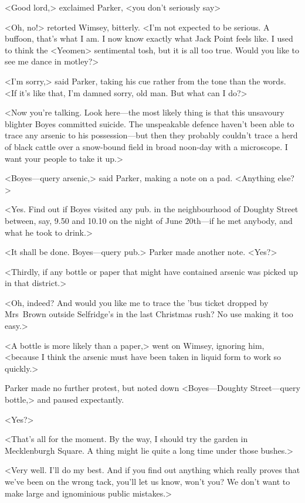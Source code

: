 <Good lord,> exclaimed Parker, <you don't seriously say\longdash>

<Oh, no!> retorted Wimsey, bitterly. <I'm not expected to be serious. A buffoon, that's what I am. I now know exactly what Jack Point feels like. I used to think the <Yeomen> sentimental tosh, but it is all too true. Would you like to see me dance in motley?>

<I'm sorry,> said Parker, taking his cue rather from the tone than the words. <If it's like that, I'm damned sorry, old man. But what can I do?>

<Now you're talking. Look here—the most likely thing is that this unsavoury blighter Boyes committed suicide. The unspeakable defence haven't been able to trace any arsenic to his possession—but then they probably couldn't trace a herd of black cattle over a snow-bound field in broad noon-day with a microscope. I want your people to take it up.>

<Boyes—query arsenic,> said Parker, making a note on a pad. <Anything else?>

<Yes. Find out if Boyes visited any pub. in the neighbourhood of Doughty Street between, say, 9.50 and 10.10 on the night of June 20th—if he met anybody, and what he took to drink.>

<It shall be done. Boyes—query pub.> Parker made another note. <Yes?>

<Thirdly, if any bottle or paper that might have contained arsenic was picked up in that district.>

<Oh, indeed? And would you like me to trace the 'bus ticket dropped by Mrs~Brown outside Selfridge's in the last Christmas rush? No use making it too easy.>

<A bottle is more likely than a paper,> went on Wimsey, ignoring him, <because I think the arsenic must have been taken in liquid form to work so quickly.>

Parker made no further protest, but noted down <Boyes—Doughty Street—query bottle,> and paused expectantly.

<Yes?>

<That's all for the moment. By the way, I should try the garden in Mecklenburgh Square. A thing might lie quite a long time under those bushes.>

<Very well. I'll do my best. And if you find out anything which really proves that we've been on the wrong tack, you'll let us know, won't you? We don't want to make large and ignominious public mistakes.>

